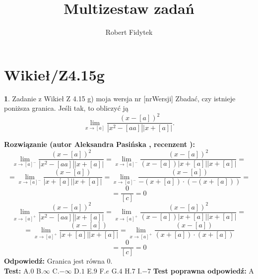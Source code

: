 \documentclass[12pt, a4paper]{article}
\title{Multizestaw zadań}
\author{Robert Fidytek}
\date{}
\theoremstyle{definition} %
\newtheorem{zad}{}
\newcommand{\kategoria}[1]{\section{#1}} %
\newcommand{\zadStart}[1]{\begin{zad}#1\newline} %
\newcommand{\zadStop}{\end{zad}}   %
\newcommand{\rozwStart}[2]{\noindent \textbf{Rozwiązanie (autor #1 , recenzent #2): }\newline} %
\newcommand{\rozwStop}{\newline}                                            %
\newcommand{\odpStart}{\noindent \textbf{Odpowiedź:}\newline}    %
\newcommand{\odpStop}{\newline}                                             %
\newcommand{\testStart}{\noindent \textbf{Test:}\newline} %
\newcommand{\testStop}{\newline} %
\newcommand{\kluczStart}{\noindent \textbf{Test poprawna odpowiedź:}\newline} %
\newcommand{\kluczStop}{\newline} %
\begin{document}
\maketitle


\kategoria{Wikieł/Z4.15g}
\zadStart{Zadanie z Wikieł Z 4.15 g) moja wersja nr [nrWersji]}
Zbadać, czy istnieje poniższa granica. Jeśli tak, to obliczyć ją $$\lim_{x\rightarrow [a]}\frac{(x-[a])^2}{|x^2-[aa]||x+[a]|}.$$
\zadStop
\rozwStart{Aleksandra Pasińska}{}
$$\lim_{x\rightarrow [a]^-}\frac{(x-[a])^2}{|x^2-[aa]||x+[a]|}=\lim_{x\rightarrow [a]^-}\frac{(x-[a])^2}{(x-[a])|x+[a]||x+[a]|}=$$
$$=\lim_{x\rightarrow [a]^-}\frac{(x-[a])}{|x+[a]||x+[a]|}=\lim_{x\rightarrow [a]^-}\frac{(x-[a])}{-(x+[a])\cdot(-(x+[a]))}=$$
$$=\frac{0}{[c]}=0$$
$$\lim_{x\rightarrow [a]^+}\frac{(x-[a])^2}{|x^2-[aa]||x+[a]|}=\lim_{x\rightarrow [a]^+}\frac{(x-[a])^2}{(x-[a])|x+[a]||x+[a]|}=$$
$$=\lim_{x\rightarrow [a]^+}\frac{(x-[a])}{|x+[a]||x+[a]|}=\lim_{x\rightarrow [a]^+}\frac{(x-[a])}{(x+[a])\cdot(x+[a])}$$ $$=\frac{0}{[c]}=0$$
\rozwStop
\odpStart
Granica jest równa 0.\\
\odpStop
\testStart
A.$0$
B.$\infty$
C.$-\infty$
D.$1$
E.$9$
F.$e$
G.$4$
H.$7$
I.$-7$
\testStop
\kluczStart
A
\kluczStop
\end{document}
